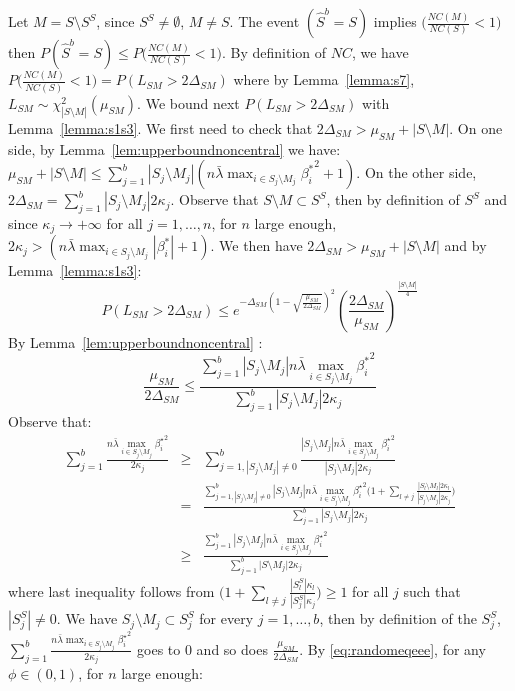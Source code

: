 \documentclass[aos]{imsart}
\theoremstyle{plain}
\begin{document}
Let $M=S\setminus S^S$, since $S^S\neq \emptyset$, $M\neq S$. The event $(\hat{S}^b=S)$ implies $\big(\frac{NC(M)}{NC(S)}<1\big)$ then $P(\hat{S}^b=S)\leq P\big(\frac{NC(M)}{NC(S)}<1\big)$. By definition of $NC$, we have
$P\big(\frac{NC(M)}{NC(S)}<1\big) = P(L_{SM}> 2\Delta_{SM})$ where by Lemma~\ref{lemma:s7},  $L_{SM}\sim \chi_{|S\setminus M|}^2(\mu_{SM})$. We  bound next $P(L_{SM}> 2\Delta_{SM})$ with Lemma~\ref{lemma:s1s3}. We first need to check that $2\Delta_{SM} > \mu_{SM} + |S\setminus M|$.
On one side, by Lemma~\ref{lem:upperboundnoncentral} we have:
$\mu_{SM} + |S\setminus M| \leq  \sum_{j=1}^b |S_j\setminus M_j|(n\bar{\lambda}\max_{i\in S_j\setminus M_j}{\beta_i^*}^2+1)$. On the other side, $2\Delta_{SM}=\sum_{j=1}^b |S_j\setminus M_j|2 \kappa_j$. Observe that $S\setminus M \subset S^S$, then by definition of $S^S$ and since $\kappa_j \to +\infty$ for all $j=1,\ldots,n$, for $n$ large enough, $2 \kappa_j >(n\bar{\lambda}\max_{i\in S_j\setminus M_j}|\beta_i^*|+1)$. We then have $2\Delta_{SM} > \mu_{SM} + |S\setminus M|$ and by Lemma~\ref{lemma:s1s3}:
\begin{equation}\label{eq:randomeqeee}
    P(L_{SM}> 2\Delta_{SM}) \leq e^{-\Delta_{SM}\left(1-\sqrt{\frac{\mu_{SM}}{2\Delta_{SM}}}\right)^2}\left(\frac{2\Delta_{SM}}{\mu_{SM}}\right)^{\frac{|S\setminus M|}{4}}
\end{equation}
By Lemma~\ref{lem:upperboundnoncentral} :
$$\frac{\mu_{SM}}{2\Delta_{SM}}\leq \frac{ \sum_{j=1}^b |S_j\setminus M_j|n\bar{\lambda}\max_{i\in S_j\setminus M_j}{\beta_i^*}^2}{\sum_{j=1}^b |S_j\setminus M_j|2 \kappa_j}$$
Observe that:
\begin{eqnarray*}
    \sum_{j=1}^b\frac{n\bar{\lambda}\max_{i\in S_j\setminus M_j}{\beta_i^{\star}}^2}{2\kappa_j}
    &\geq &\sum_{j=1,|S_j\setminus M_j|\neq 0}^b\frac{|S_j\setminus M_j|n\bar{\lambda}\max_{i\in S_j\setminus M_j}{\beta_i^{\star}}^2}{|S_j\setminus M_j|2\kappa_j} \\
    &=& \frac{\sum_{j=1,|S_j\setminus M_j|\neq 0 }^b|S_j\setminus M_j|n\bar{\lambda}\max_{i\in S_j\setminus M_j}{\beta_i^{\star}}^2\Big(1+\sum_{l\neq j}\frac{|S_l\setminus M_l|2\kappa_l}{|S_j\setminus M_j|2\kappa_j}\Big)}{\sum_{j=1}^b|S_j\setminus M_j|2\kappa_j} \\
    &\geq & \frac{\sum_{j=1}^b|S_j\setminus M_j|n\bar{\lambda}\max_{i\in S_j\setminus M_j}{\beta_i^{\star}}^2}{\sum_{j=1}^b \big|S\setminus M_j\big|2\kappa_j} 
\end{eqnarray*}
where last inequality follows from $\Big(1+\sum_{l\neq j}\frac{|S_l^S|\kappa_l}{|S_j^S|\kappa_j}\Big)\geq 1$ for all $j$ such that $|S_j^S|\neq 0$. We have $S_j\setminus M_j \subset S_j^S$ for every $j=1,\ldots,b$, then by definition of the $S_j^S$, $\sum_{j=1}^b\frac{n\bar{\lambda}\max_{i\in S_j\setminus M_j}{\beta_i^{\star}}^2}{2\kappa_j}$ goes to 0 and so does $\frac{\mu_{SM}}{2\Delta_{SM}}$. By \eqref{eq:randomeqeee}, for any $\phi \in (0,1)$, for $n$ large enough:
\end{document}
